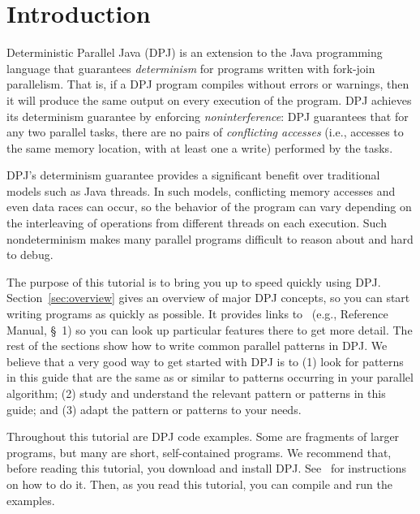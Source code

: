 \section{Introduction%
\label{sec:introduction}}

Deterministic Parallel Java (DPJ) is an extension to the Java
programming language that guarantees \emph{determinism} for programs
written with fork-join parallelism.  That is, if a DPJ program
compiles without errors or warnings, then it will produce the same
output on every execution of the program.  DPJ achieves its
determinism guarantee by enforcing \emph{noninterference}: DPJ
guarantees that for any two parallel tasks, there are no pairs of
\emph{conflicting accesses} (i.e., accesses to the same memory
location, with at least one a write) performed by the tasks.

DPJ's determinism guarantee provides a significant benefit over
traditional models such as Java threads.  In such models, conflicting
memory accesses and even data races can occur, so the behavior of the
program can vary depending on the interleaving of operations from
different threads on each execution.  Such nondeterminism makes many
parallel programs difficult to reason about and hard to debug.

The purpose of this tutorial is to bring you up to speed quickly using
DPJ.  Section~\ref{sec:overview} gives an overview of major DPJ
concepts, so you can start writing programs as quickly as possible.
It provides links to \ (e.g., Reference Manual, \S~1) so you
can look up particular features there to get more detail.  The rest of
the sections show how to write common parallel patterns in DPJ.  We
believe that a very good way to get started with DPJ is to (1) look
for patterns in this guide that are the same as or similar to patterns
occurring in your parallel algorithm; (2) study and understand the
relevant pattern or patterns in this guide; and (3) adapt the pattern
or patterns to your needs.

Throughout this tutorial are DPJ code examples.  Some are fragments of
larger programs, but many are short, self-contained programs.  We
recommend that, before reading this tutorial, you download and
install DPJ.  See \installmanual\ for instructions on how to do it.
Then, as you read this tutorial, you can compile and run the examples.


